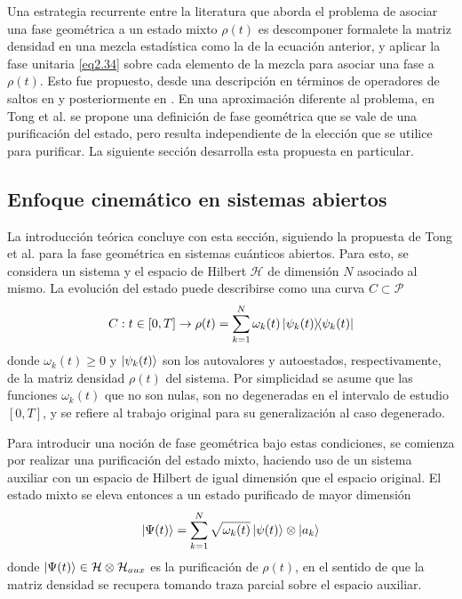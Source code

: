 Una estrategia recurrente entre la literatura que aborda el problema de asociar una fase geométrica a un estado mixto $\rho(t)$ es descomponer formalete la matriz densidad en una mezcla estadística como la de la ecuación anterior, y aplicar la fase unitaria \ref{eq2.34} sobre cada elemento de la mezcla para asociar una fase a $\rho(t)$. Esto fue propuesto, desde una descripción en términos de operadores de saltos en \cite{32,33} y posteriormente en \cite{34-37}. En una aproximación diferente al problema, en Tong et al. \cite{31} se propone una definición de fase geométrica que se vale de una purificación del estado, pero resulta independiente de la elección que se utilice para purificar. La siguiente sección desarrolla esta propuesta en particular.
\subsection{Enfoque cinemático en sistemas abiertos}
La introducción teórica concluye con esta sección, siguiendo la propuesta de Tong et al. \cite{31} para la fase geométrica en sistemas cuánticos abiertos. Para esto, se considera un sistema y el espacio de Hilbert $\mathcal{H}$ de dimensión $N$ asociado al mismo. La evolución del estado puede describirse como una curva $C \subset \mathcal{P}$
\begin{equation}
    C:t\in[0,T] \rightarrow \rho(t) = \sum_{k=1}^N\omega_k(t)\ketbra{\psi_k(t)}{\psi_k(t)}
\end{equation}
donde $\omega_k(t)\geq 0$ y $\ket{\psi_k(t)}$ son los autovalores y autoestados, respectivamente, de la matriz densidad $\rho(t)$ del sistema. Por simplicidad se asume que las funciones $\omega_k(t)$ que no son nulas, son no degeneradas en el intervalo de estudio $[0,T]$, y se refiere al trabajo original \cite{31} para su generalización al caso degenerado.

Para introducir una noción de fase geométrica bajo estas condiciones, se comienza por realizar una purificación del estado mixto, haciendo uso de un sistema auxiliar con un espacio de Hilbert de igual dimensión que el espacio original. El estado mixto se eleva entonces a un estado purificado de mayor dimensión
\begin{equation}
    \ket{\Psi(t)}=\sum_{k=1}^N\sqrt{\omega_k(t)}\ket{\psi(t)}\otimes\ket{a_k}
\end{equation}
donde $\ket{\Psi(t)}\in \mathcal{H}\otimes\mathcal{H}_{aux}$ es la purificación de $\rho(t)$, en el sentido de que la matriz densidad se recupera tomando traza parcial sobre el espacio auxiliar. 

